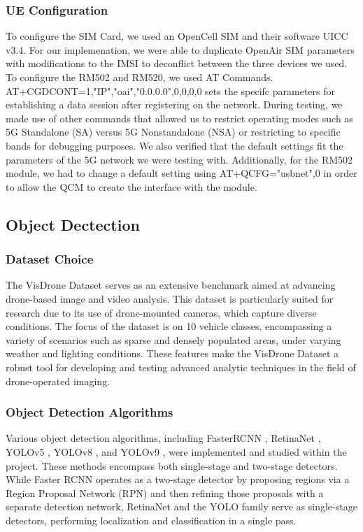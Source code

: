 \documentclass[conference]{IEEEtran}
\begin{document}
\subsubsection{UE Configuration}
To configure the SIM Card, we used an OpenCell SIM and their software UICC v3.4. For our implemenation, we were able to duplicate OpenAir SIM parameters with modifications to the IMSI to deconflict between the three devices we used. To configure the RM502 and RM520, we used AT Commands. AT+CGDCONT=1,"IP","oai","0.0.0.0",0,0,0,0 sets the specifc parameters for establishing a data session after registering on the network. During testing, we made use of other commands that allowed us to restrict operating modes such as 5G Standalone (SA) versus 5G Nonstandalone (NSA) or restricting to specific bands for debugging purposes. We also verified that the default settings fit the parameters of the 5G network we were testing with. Additionally, for the RM502 module, we had to change a default setting using AT+QCFG="usbnet",0 in order to allow the QCM to create the interface with the module. 

\subsection{Object Dectection}
\subsubsection{Dataset Choice}
The VisDrone Dataset\cite{visdrone} serves as an extensive benchmark aimed at advancing drone-based image and video analysis. This dataset is particularly suited for research due to its use of drone-mounted cameras, which capture diverse conditions. The focus of the dataset is on 10 vehicle classes, encompassing a variety of scenarios such as sparse and densely populated areas, under varying weather and lighting conditions. These features make the VisDrone Dataset a robust tool for developing and testing advanced analytic techniques in the field of drone-operated imaging.

\subsubsection{Object Detection Algorithms}

Various object detection algorithms, including FasterRCNN \cite{FasterRCNN}, RetinaNet \cite{RetinaNet}, YOLOv5 \cite{YOLOv5}, YOLOv8 \cite{YOLOv8}, and YOLOv9 \cite{YOLOv9}, were implemented and studied within the project. These methods encompass both single-stage and two-stage detectors. While Faster RCNN operates as a two-stage detector by proposing regions via a Region Proposal Network (RPN) and then refining those proposals with a separate detection network, RetinaNet and the YOLO family serve as single-stage detectors, performing localization and classification in a single pass.
\end{document}
